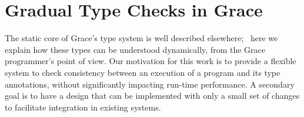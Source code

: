 
\section{Gradual Type Checks in Grace}
\label{sec:method}




%
%
The static core of Grace's type system is well described
elsewhere\citep{TimJonesThesis};%
~here we explain how
these types can be understood 
dynamically, from the Grace programmer's point of view.
Our motivation for this work
is to provide a flexible system 
to check consistency between an execution of a program
and its type annotations,
without significantly impacting run-time performance.
A secondary goal is to have a design that can be implemented with
only a small set of changes to facilitate integration in existing systems.
%
%


